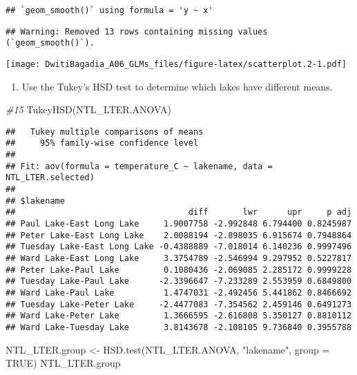 \documentclass[
]{article}
\newenvironment{Shaded}{\begin{snugshade}}{\end{snugshade}}
\newcommand{\AttributeTok}[1]{\textcolor[rgb]{0.77,0.63,0.00}{#1}}
\newcommand{\CommentTok}[1]{\textcolor[rgb]{0.56,0.35,0.01}{\textit{#1}}}
\newcommand{\ConstantTok}[1]{\textcolor[rgb]{0.00,0.00,0.00}{#1}}
\newcommand{\FunctionTok}[1]{\textcolor[rgb]{0.00,0.00,0.00}{#1}}
\newcommand{\NormalTok}[1]{#1}
\newcommand{\OtherTok}[1]{\textcolor[rgb]{0.56,0.35,0.01}{#1}}
\newcommand{\StringTok}[1]{\textcolor[rgb]{0.31,0.60,0.02}{#1}}
\providecommand{\tightlist}{%
  \setlength{\itemsep}{0pt}\setlength{\parskip}{0pt}}
\begin{document}
\begin{verbatim}
## `geom_smooth()` using formula = 'y ~ x'
\end{verbatim}

\begin{verbatim}
## Warning: Removed 13 rows containing missing values (`geom_smooth()`).
\end{verbatim}

\texttt{[image: DwitiBagadia\_A06\_GLMs\_files/figure-latex/scatterplot.2-1.pdf]}

\begin{enumerate}
\def\labelenumi{\arabic{enumi}.}
\setcounter{enumi}{14}
\tightlist
\item
  Use the Tukey's HSD test to determine which lakes have different
  means.
\end{enumerate}

\begin{Shaded}
\begin{Highlighting}[]
\CommentTok{\#15}
\FunctionTok{TukeyHSD}\NormalTok{(NTL\_LTER.ANOVA)}
\end{Highlighting}
\end{Shaded}

\begin{verbatim}
##   Tukey multiple comparisons of means
##     95% family-wise confidence level
## 
## Fit: aov(formula = temperature_C ~ lakename, data = NTL_LTER.selected)
## 
## $lakename
##                                   diff       lwr      upr     p adj
## Paul Lake-East Long Lake     1.9007758 -2.992848 6.794400 0.8245987
## Peter Lake-East Long Lake    2.0088194 -2.898035 6.915674 0.7948864
## Tuesday Lake-East Long Lake -0.4388889 -7.018014 6.140236 0.9997496
## Ward Lake-East Long Lake     3.3754789 -2.546994 9.297952 0.5227817
## Peter Lake-Paul Lake         0.1080436 -2.069085 2.285172 0.9999228
## Tuesday Lake-Paul Lake      -2.3396647 -7.233289 2.553959 0.6849800
## Ward Lake-Paul Lake          1.4747031 -2.492456 5.441862 0.8466692
## Tuesday Lake-Peter Lake     -2.4477083 -7.354562 2.459146 0.6491273
## Ward Lake-Peter Lake         1.3666595 -2.616808 5.350127 0.8810112
## Ward Lake-Tuesday Lake       3.8143678 -2.108105 9.736840 0.3955788
\end{verbatim}

\begin{Shaded}
\begin{Highlighting}[]
\NormalTok{NTL\_LTER.group }\OtherTok{\textless{}{-}} \FunctionTok{HSD.test}\NormalTok{(NTL\_LTER.ANOVA, }\StringTok{"lakename"}\NormalTok{, }\AttributeTok{group =} \ConstantTok{TRUE}\NormalTok{)}
\NormalTok{NTL\_LTER.group}
\end{Highlighting}
\end{Shaded}
\end{document}
